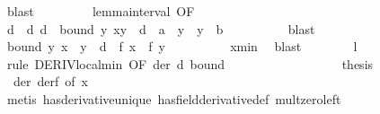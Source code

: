 \begin{isabellebody}
\ blast\ \isanewline
\ \ \ \ \ \ \isamarkupfalse%
\ lemma{\isacharunderscore}{\kern0pt}interval\ {\isacharbrackleft}{\kern0pt}OF\ {}{\isacharbrackright}{\kern0pt}\isanewline
\ \ \ \ \ \ \isamarkupfalse%
\ d\ \ d{\isacharcolon}{\kern0pt}\ {\isachardoublequoteopen}{}{\isacharless}{\kern0pt}d{\isachardoublequoteclose}\ \ bound{\isacharcolon}{\kern0pt}\ {\isachardoublequoteopen}{\isasymforall}y{\isachardot}{\kern0pt}\ {\isasymbar}x{\isacharprime}{\kern0pt}{\isacharminus}{\kern0pt}y{\isasymbar}\ {\isacharless}{\kern0pt}\ d\ {\isasymlongrightarrow}\ a\ {\isasymle}\ y\ {\isasymand}\ y\ {\isasymle}\ b{\isachardoublequoteclose}\isanewline
\ \ \ \ \ \ \ \ \isamarkupfalse%
\ blast\isanewline
\ \ \ \ \ \ \isamarkupfalse%
\ \isamarkupfalse%
\ bound{\isacharprime}{\kern0pt}{\isacharcolon}{\kern0pt}\ {\isachardoublequoteopen}{\isasymforall}y{\isachardot}{\kern0pt}\ {\isasymbar}x{\isacharprime}{\kern0pt}\ {\isacharminus}{\kern0pt}\ y{\isasymbar}\ {\isacharless}{\kern0pt}\ d\ {\isasymlongrightarrow}\ f\ x{\isacharprime}{\kern0pt}\ {\isasymle}\ f\ y{\isachardoublequoteclose}\isanewline
\ \ \ \ \ \ \ \ \isamarkupfalse%
\ x{\isacharprime}{\kern0pt}{\isacharunderscore}{\kern0pt}min\ \isamarkupfalse%
\ blast\isanewline
\ \ \ \ \ \ \isamarkupfalse%
\ {\isachardoublequoteopen}l\ {\isacharequal}{\kern0pt}\ {}{\isachardoublequoteclose}\ \isamarkupfalse%
\ {\isacharparenleft}{\kern0pt}rule\ DERIV{\isacharunderscore}{\kern0pt}local{\isacharunderscore}{\kern0pt}min\ {\isacharbrackleft}{\kern0pt}OF\ der\ d\ bound{\isacharprime}{\kern0pt}{\isacharbrackright}{\kern0pt}{\isacharparenright}{\kern0pt}\isanewline
\ \ \ \ \ \ \ \ %
\isanewline
\ \ \ \ \ \ \isamarkupfalse%
\ \isamarkupfalse%
\ {\isacharquery}{\kern0pt}thesis\ \isamarkupfalse%
\ {}\ der\ derf\ {\isacharbrackleft}{\kern0pt}of\ x{\isacharprime}{\kern0pt}{\isacharbrackright}{\kern0pt}\ \isanewline
\ \ \ \ \ \ \ \ \isamarkupfalse%
\ {\isacharparenleft}{\kern0pt}metis\ has{\isacharunderscore}{\kern0pt}derivative{\isacharunderscore}{\kern0pt}unique\ has{\isacharunderscore}{\kern0pt}field{\isacharunderscore}{\kern0pt}derivative{\isacharunderscore}{\kern0pt}def\ mult{\isacharunderscore}{\kern0pt}zero{\isacharunderscore}{\kern0pt}left{\isacharparenright}{\kern0pt}\isanewline
\ \ \ \ \isamarkupfalse%

\end{isabellebody}
